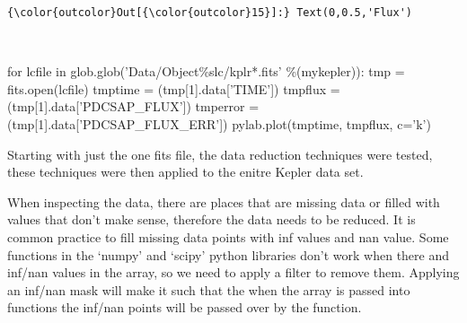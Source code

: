 \documentclass[11pt]{article}
\begin{document}
\begin{Verbatim}[commandchars=\\\{\}]
{\color{outcolor}Out[{\color{outcolor}15}]:} Text(0,0.5,'Flux')
\end{Verbatim}
            
    \begin{center}
    \end{center}
    { \hspace*{\fill} \\}
    
    for lcfile in glob.glob('Data/Object\%slc/kplr*.fits' \%(mykepler)): tmp
= fits.open(lcfile) tmptime = (tmp{[}1{]}.data{[}'TIME'{]}) tmpflux =
(tmp{[}1{]}.data{[}'PDCSAP\_FLUX'{]}) tmperror =
(tmp{[}1{]}.data{[}'PDCSAP\_FLUX\_ERR'{]}) pylab.plot(tmptime, tmpflux,
c='k')

    Starting with just the one fits file, the data reduction techniques were
tested, these techniques were then applied to the enitre Kepler data
set.

When inspecting the data, there are places that are missing data or
filled with values that don't make sense, therefore the data needs to be
reduced. It is common practice to fill missing data points with inf
values and nan value. Some functions in the `numpy' and `scipy' python
libraries don't work when there and inf/nan values in the array, so we
need to apply a filter to remove them. Applying an inf/nan mask will
make it such that the when the array is passed into functions the
inf/nan points will be passed over by the function.
\end{document}
